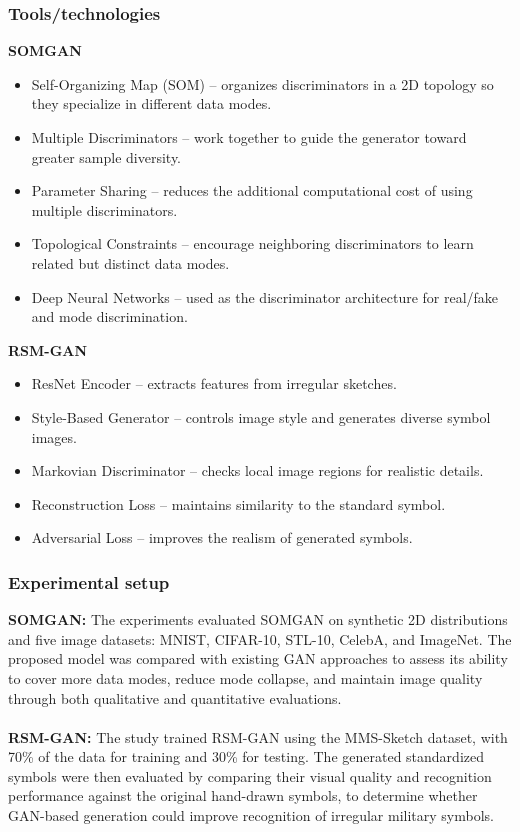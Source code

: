 \documentclass[12pt,a4paper]{article}
\begin{document}
\subsubsection{Tools/technologies}
\textbf{SOMGAN}
\begin{itemize}
    \item Self-Organizing Map (SOM) – organizes discriminators in a 2D topology so they specialize in different data modes.
    \item Multiple Discriminators – work together to guide the generator toward greater sample diversity.
    \item Parameter Sharing – reduces the additional computational cost of using multiple discriminators.
    \item Topological Constraints – encourage neighboring discriminators to learn related but distinct data modes.
    \item Deep Neural Networks – used as the discriminator architecture for real/fake and mode discrimination.
\end{itemize}
\textbf{RSM-GAN}
\begin{itemize}
    \item ResNet Encoder – extracts features from irregular sketches. \item Style-Based Generator – controls image style and generates diverse symbol images.
    \item Markovian Discriminator – checks local image regions for realistic details.
    \item Reconstruction Loss – maintains similarity to the standard symbol.
    \item Adversarial Loss – improves the realism of generated symbols.
\end{itemize}

\subsubsection{Experimental setup}
\textbf{SOMGAN:} The experiments evaluated SOMGAN on synthetic 2D distributions and five image datasets: MNIST, CIFAR-10, STL-10, CelebA, and ImageNet. The proposed model was compared with existing GAN approaches to assess its ability to cover more data modes, reduce mode collapse, and maintain image quality through both qualitative and quantitative evaluations. \\
\\ \textbf{RSM-GAN:} The study trained RSM-GAN using the MMS-Sketch dataset, with 70\% of the data for training and 30\% for testing. The generated standardized symbols were then evaluated by comparing their visual quality and recognition performance against the original hand-drawn symbols, to determine whether GAN-based generation could improve recognition of irregular military symbols.
\end{document}
